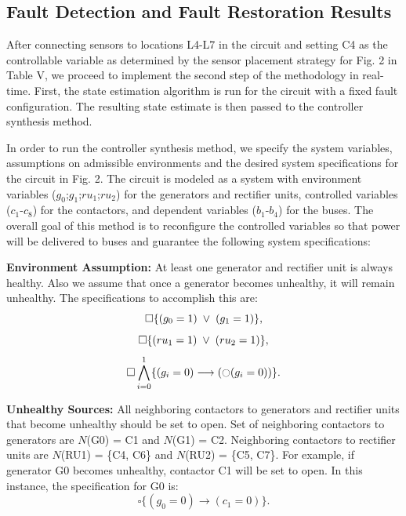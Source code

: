 \documentclass[journal]{IEEEtran}
\newcommand{\always}{\square}
\renewcommand{\next}{\ocircle}
\newcommand{\oor}{\hspace{1mm}\vee\hspace{1mm}}
\begin{document}
\subsection{Fault Detection and Fault Restoration Results}
After connecting sensors to locations L4-L7 in the circuit and setting C4 as the controllable variable as determined by the sensor placement strategy for Fig. 2 in Table V, we proceed to implement the second step of the methodology in real-time. First, the state estimation algorithm is run for the circuit with a fixed fault configuration. The resulting state estimate is then passed to the controller synthesis method. 

In order to run the controller synthesis method, we specify the system variables, assumptions on admissible environments and the desired system specifications for the circuit in Fig. 2. The circuit is modeled as a system with environment variables ($g_{0}$;$g_{1}$;$ru_{1}$;$ru_{2}$) for the generators and rectifier units, controlled variables ($c_{1}$-$c_{8}$) for the contactors, and dependent variables ($b_{1}$-$b_{4}$) for the buses. The overall goal of this method is to reconfigure the controlled variables so that power will be delivered to buses and guarantee the following system specifications:

{\bf Environment Assumption:} At least one generator and rectifier unit is always healthy. Also we assume that once a
generator becomes unhealthy, it will remain unhealthy. The specifications to accomplish this are:
\begin{equation}
\always \{(g_{0} = 1) \oor (g_{1} = 1)\},
\end{equation}
\begin{equation}
\always \{(ru_{1} = 1) \oor (ru_{2} = 1)\},
\end{equation}
\begin{equation}
\always \bigwedge_{i = 0}^{1} \{ (g_{i} = 0) \longrightarrow (\next (g_{i} = 0))\}.
\end{equation}

{\bf Unhealthy Sources:} All neighboring contactors to generators and rectifier units that become unhealthy should be set to open. Set of neighboring contactors to generators are $\mathit{N}$(G0) = C1 and $\mathit{N}$(G1) = C2. Neighboring contactors to rectifier units are $\mathit{N}$(RU1) = \{C4, C6\} and $\mathit{N}$(RU2) = \{C5, C7\}. For example, if generator G0 becomes unhealthy, contactor C1 will be set to open. In this instance, the specification for G0 is:
\begin{equation}
\always \{(g_{0} = 0) \longrightarrow (c_{1} = 0)\}.
\end{equation}
\end{document}
